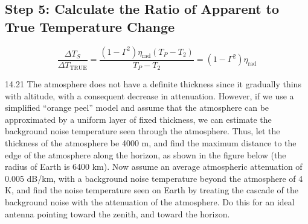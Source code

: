 \documentclass[cn,12pt]{homework}
\begin{document}
\begin{solution}
\subsection*{Step 5: Calculate the Ratio of Apparent to True Temperature Change}
\[ \frac{\Delta T_S}{\Delta T_{\text{TRUE}}} = \frac{(1-\Gamma^2)\eta_{\text{rad}}(T_P - T_2)}{T_P - T_2} = (1-\Gamma^2)\eta_{\text{rad}} \]
\end{solution}
\newpage


14.21 The atmosphere does not have a definite thickness since it gradually thins with altitude, with a consequent decrease in attenuation. However, if we use a simplified “orange peel” model and assume that
the atmosphere can be approximated by a uniform layer of fixed thickness, we can estimate the background noise temperature seen through the atmosphere. Thus, let the thickness of the atmosphere
be 4000 m, and find the maximum distance  to the edge of the atmosphere along the horizon, as
shown in the figure below (the radius of Earth is 6400 km). Now assume an average atmospheric
attenuation of 0.005 dB/km, with a background noise temperature beyond the atmosphere of 4 K,
and find the noise temperature seen on Earth by treating the cascade of the background noise with
the attenuation of the atmosphere. Do this for an ideal antenna pointing toward the zenith, and toward
the horizon.
\end{document}
